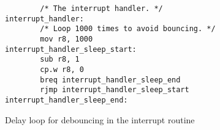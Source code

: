 \begin{figure}[ht]
\centering
\lstset{language=[Motorola68k]Assembler,basicstyle=\ttfamily,numbers=left,firstnumber=86}
\begin{lstlisting}
        /* The interrupt handler. */
interrupt_handler:
        /* Loop 1000 times to avoid bouncing. */
        mov r8, 1000
interrupt_handler_sleep_start:
        sub r8, 1
        cp.w r8, 0
        breq interrupt_handler_sleep_end
        rjmp interrupt_handler_sleep_start
interrupt_handler_sleep_end:
\end{lstlisting}
\caption{Delay loop for debouncing in the interrupt routine}
\label{lst:debouncing}
\end{figure}
